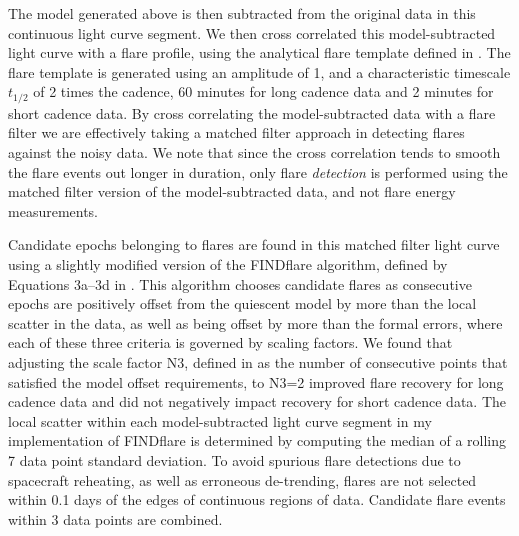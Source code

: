 \documentclass[twocolumn]{aastex6}
\begin{document}
The model generated above is then subtracted from the original data in this continuous light curve segment. We then cross correlated this model-subtracted light curve with a flare profile, using the analytical flare template defined in \citet{davenport2014b}. The flare template is generated using an amplitude of 1, and a characteristic timescale $t_{1/2}$ of 2 times the cadence, 60 minutes for long cadence data and 2 minutes for short cadence data. By cross correlating the model-subtracted data with a flare filter we are effectively taking a matched filter approach in detecting flares against the noisy data. We note that since the cross correlation tends to smooth the flare events out longer in duration, only flare {\it detection} is performed using the matched filter version of the model-subtracted data, and not flare energy measurements.

Candidate epochs belonging to flares are found in this matched filter light curve using a slightly modified version of the FINDflare algorithm, defined by Equations 3a--3d in \citet{chang2015}. This algorithm chooses candidate flares as consecutive epochs are positively offset from the quiescent model by more than the local scatter in the data, as well as being offset by more than the formal errors, where each of these three criteria is governed by scaling factors.
We found that adjusting the scale factor N3, defined in \citet{chang2015} as the number of consecutive points that satisfied the model offset requirements, to N3=2 improved flare recovery for long cadence data and did not negatively impact recovery for short cadence data. The local scatter within each model-subtracted light curve segment in my implementation of FINDflare is determined by computing the median of a rolling 7 data point standard deviation.
To avoid spurious flare detections due to spacecraft reheating, as well as erroneous de-trending, flares are not selected within 0.1 days of the edges of continuous regions of data. Candidate flare events within 3 data points are combined.
\end{document}
